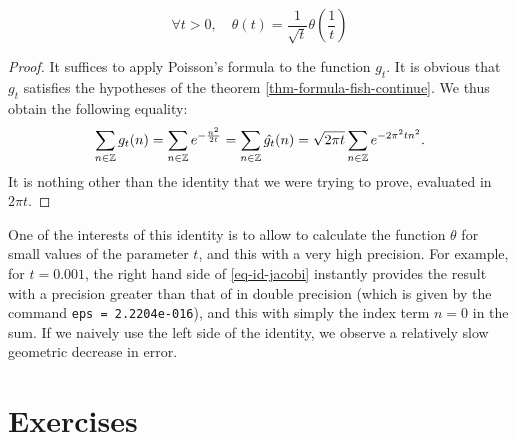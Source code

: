 \begin{thm}
\begin{equation}
\label{eq-id-jacobi}
\forall t> 0, \quad \theta (t) = \frac{1}{\sqrt{t}} \theta \left(\frac{1}{t} \right)
\end{equation}
\end{thm}
\begin{proof}
It suffices to apply Poisson's formula to the function $ g_t $. It is obvious that $ g_t $ satisfies the hypotheses of the theorem \ref{thm-formula-fish-continue}. We thus obtain the following equality:
\begin{equation*}
\sum_{n \in \mathbb{Z}}{g_t (n)} = \sum_{n \in \mathbb{Z}}{e^{- \frac{n^2}{2t}}} = \sum_{n \in \mathbb{Z}}{\hat{g_t} (n)} = \sqrt{2 \pi t} \sum_{n \in \mathbb{Z}}{e^{- 2 \pi^2 tn^2}}.
\end{equation*}
It is nothing other than the identity that we were trying to prove, evaluated in $ 2 \pi t $.
\end{proof}
 One of the interests of this identity is to allow to calculate the function $ \theta $ for small values of the parameter $ t $, and this with a very high precision. For example, for $ t = 0.001 $, the right hand side of \eqref{eq-id-jacobi} instantly provides the result with a precision greater than that of \Matlab{} in double precision (which is given by the command \texttt{eps = 2.2204e-016}), and this with simply the index term $n = 0$  in the sum. If we naively use the left side of the identity, we observe a relatively slow geometric decrease in error.

\section{Exercises}
 
 
 
